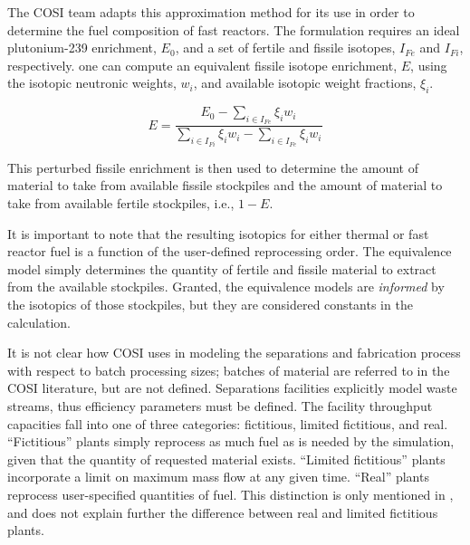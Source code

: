 The COSI team adapts this approximation method for its use in order to determine
the fuel composition of fast reactors. The formulation requires an ideal
plutonium-239 enrichment, $E_0$, and a set of fertile and fissile isotopes,
$I_{Fe}$ and $I_{Fi}$, respectively. one can compute an equivalent fissile
isotope enrichment, $E$, using the isotopic neutronic weights, $w_i$, and
available isotopic weight fractions, $\xi_i$.

\begin{equation*}
E = \frac{E_0 - \sum_{i \in I_{Fe}} \xi_i w_i}
         {\sum_{i \in I_{Fi}} \xi_i w_i - \sum_{i \in I_{Fe}} \xi_i w_i}
\end{equation*}

This perturbed fissile enrichment is then used to determine the amount of
material to take from available fissile stockpiles and the amount of material to
take from available fertile stockpiles, i.e., $1 - E$.

It is important to note that the resulting isotopics for either thermal or fast
reactor fuel is a function of the user-defined reprocessing order. The
equivalence model simply determines the quantity of fertile and fissile material
to extract from the available stockpiles. Granted, the equivalence models
are \textit{informed} by the isotopics of those stockpiles, but they are
considered constants in the calculation. 

It is not clear how COSI uses in modeling the separations and fabrication
process with respect to batch processing sizes; batches of material are referred
to in the COSI literature, but are not defined. Separations facilities
explicitly model waste streams, thus efficiency parameters must be defined. The
facility throughput capacities fall into one of three categories: fictitious,
limited fictitious, and real. ``Fictitious'' plants simply reprocess as much
fuel as is needed by the simulation, given that the quantity of requested
material exists. ``Limited fictitious'' plants incorporate a limit on maximum
mass flow at any given time. ``Real'' plants reprocess user-specified quantities
of fuel. This distinction is only mentioned in \cite{guerin_benchmark_2009}, and
does not explain further the difference between real and limited fictitious
plants.

